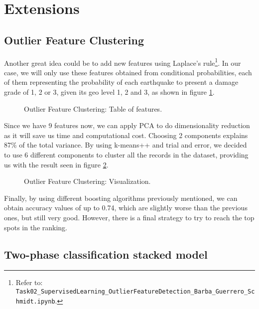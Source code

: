 \section{Extensions}
\label{SECTION_Extensions}

\subsection{Outlier Feature Clustering}
\label{SUBSECTION_OutlierFeatureClustering}

Another great idea could be to add new features using Laplace’s rule\footnote{Refer to: \texttt{Task02\_SupervisedLearning\_OutlierFeatureDetection\_Barba\_Guerrero\_Schmidt.ipynb}.}. In our case, we will only use these features obtained from conditional probabilities, each of them representing the probability of each earthquake to present a damage grade of 1, 2 or 3, given its geo level 1, 2 and 3, as shown in figure \ref{PICTURE_tableoffeatures_ofc}.

\begin{figure}[h!]
	\centering
	\caption{Outlier Feature Clustering: Table of features.}
	\label{PICTURE_tableoffeatures_ofc}
\end{figure}

Since we have 9 features now, we can apply PCA to do dimensionality reduction as it will save us time and computational cost. Choosing 2 components explains 87\% of the total variance. By using k-means++ and trial and error, we decided to use 6 different components to cluster all the records in the dataset, providing us with the result seen in figure \ref{PICTURE_visualization_ofc}.

\begin{figure}[h!]
	\centering
	\caption{Outlier Feature Clustering: Visualization.}
	\label{PICTURE_visualization_ofc}
\end{figure}

Finally, by using different boosting algorithms previously mentioned, we can obtain accuracy values of up to 0.74, which are slightly worse than the previous ones, but still very good. However, there is a final strategy to try to reach the top spots in the ranking.

\subsection{Two-phase classification stacked model}
\label{SUBSECTION_TwoPhaseClassificationStackedModel}

